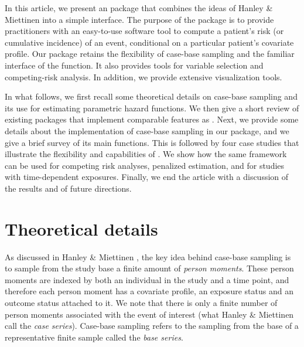 \documentclass[
]{jss}
\begin{document}
In this article, we present an  package that combines the
ideas of Hanley \& Miettinen into a simple interface. The purpose of the
 package is to provide practitioners with an easy-to-use
software tool to compute a patient's risk (or cumulative incidence) of
an event, conditional on a particular patient's covariate profile. Our
package retains the flexibility of case-base sampling and the familiar
interface of the  function. It also provides tools for
variable selection and competing-risk analysis. In addition, we provide
extensive visualization tools.

In what follows, we first recall some theoretical details on case-base
sampling and its use for estimating parametric hazard functions. We then
give a short review of existing  packages that implement
comparable features as . Next, we provide some details
about the implementation of case-base sampling in our package, and we
give a brief survey of its main functions. This is followed by four case
studies that illustrate the flexibility and capabilities of
. We show how the same framework can be used for competing
risk analyses, penalized estimation, and for studies with time-dependent
exposures. Finally, we end the article with a discussion of the results
and of future directions.

\hypertarget{theory}{%
\section{Theoretical details}\label{theory}}

As discussed in Hanley \& Miettinen \citeyearpar{hanley2009fitting}, the
key idea behind case-base sampling is to sample from the study base a
finite amount of \emph{person moments}. These person moments are indexed
by both an individual in the study and a time point, and therefore each
person moment has a covariate profile, an exposure status and an outcome
status attached to it. We note that there is only a finite number of
person moments associated with the event of interest (what Hanley \&
Miettinen call the \emph{case series}). Case-base sampling refers to the
sampling from the base of a representative finite sample called the
\emph{base series}.
\end{document}
